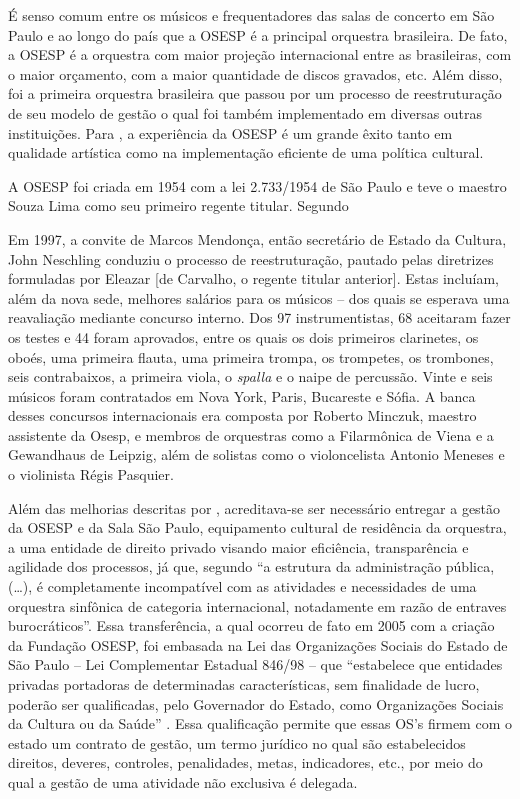 \documentclass[a4paper, 12pt, openright, oneside, german, french, english, brazil]{abntex2}
\begin{document}
	É senso comum entre os músicos e frequentadores das salas de concerto em São Paulo e ao longo do país que a OSESP é a principal orquestra brasileira. De fato, a OSESP é a orquestra com maior projeção internacional entre as brasileiras, com o maior orçamento, com a maior quantidade de discos gravados, etc. Além disso, foi a primeira orquestra brasileira que passou por um processo de reestruturação de seu modelo de gestão o qual foi também implementado em diversas outras instituições. Para , a experiência da OSESP é um grande êxito tanto em qualidade artística como na implementação eficiente de uma política cultural.
	
	A OSESP foi criada em 1954 com a lei 2.733/1954 de São Paulo e teve o maestro Souza Lima como seu primeiro regente titular. Segundo 
	
	\begin{citacao}
		Em 1997, a convite de Marcos Mendonça, então secretário de Estado da Cultura, John Neschling conduziu o processo de reestruturação, pautado pelas diretrizes formuladas por Eleazar [de Carvalho, o regente titular anterior]. Estas incluíam, além da nova sede, melhores salários para os músicos -- dos quais se esperava uma reavaliação mediante concurso interno. Dos 97 instrumentistas, 68 aceitaram fazer os testes e 44 foram aprovados, entre os quais os dois primeiros clarinetes, os oboés, uma primeira flauta, uma primeira trompa, os trompetes, os trombones, seis contrabaixos, a primeira viola, o \textit{spalla} e o naipe de percussão. Vinte e seis músicos foram contratados em Nova York, Paris, Bucareste e Sófia. A banca desses concursos internacionais era composta por Roberto Minczuk, maestro assistente da Osesp, e membros de orquestras como a Filarmônica de Viena e a Gewandhaus de Leipzig, além de solistas como o violoncelista Antonio Meneses e o violinista Régis Pasquier. \cite{marques2015osesp}
	\end{citacao}
	
	Além das melhorias descritas por , acreditava-se ser necessário entregar a gestão da OSESP e da Sala São Paulo, equipamento cultural de residência da orquestra, a uma entidade de direito privado visando maior eficiência, transparência e agilidade dos processos, já que, segundo  ``a estrutura da administração pública, (\ldots), é completamente incompatível com as atividades e necessidades de uma orquestra sinfônica de categoria internacional, notadamente em razão de entraves burocráticos''. Essa transferência, a qual ocorreu de fato em 2005 com a criação da Fundação OSESP, foi embasada na Lei das Organizações Sociais do Estado de São Paulo -- Lei Complementar Estadual 846/98 -- que ``estabelece que entidades privadas portadoras de determinadas características, sem finalidade de lucro, poderão ser qualificadas, pelo Governador do Estado, como Organizações Sociais da Cultura ou da Saúde'' \cite[p. 6]{arruda2010parcerias}. Essa qualificação permite que essas OS's firmem com o estado um contrato de gestão, um termo jurídico no qual são estabelecidos direitos, deveres, controles, penalidades, metas, indicadores, etc., por meio do qual a gestão de uma atividade não exclusiva é delegada. 
	
\end{document}
